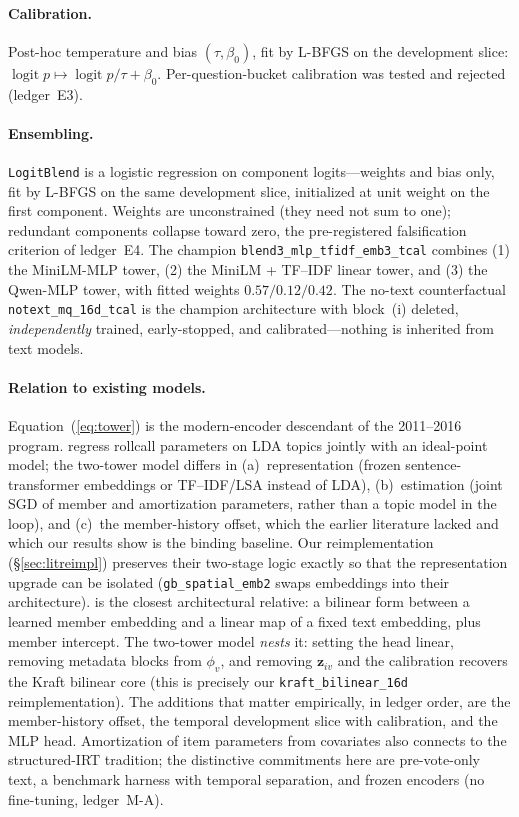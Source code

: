 \documentclass[11pt]{article}
\newcommand{\code}[1]{\texttt{#1}}
\begin{document}
\paragraph{Calibration.} Post-hoc temperature and bias
$(\tau, \beta_0)$, fit by L-BFGS on the development slice:
$\operatorname{logit} p \mapsto \operatorname{logit} p / \tau +
\beta_0$. Per-question-bucket calibration was tested and rejected
(ledger~E3).

\paragraph{Ensembling.} \code{LogitBlend} is a logistic regression on
component logits---weights and bias only, fit by L-BFGS on the same
development slice, initialized at unit weight on the first component.
Weights are unconstrained (they need not sum to one); redundant
components collapse toward zero, the pre-registered falsification
criterion of ledger~E4. The champion \code{blend3\_mlp\_tfidf\_emb3\_tcal}
combines (1) the MiniLM-MLP tower, (2) the MiniLM + TF--IDF linear
tower, and (3) the Qwen-MLP tower, with fitted weights
$0.57/0.12/0.42$. The no-text counterfactual \code{notext\_mq\_16d\_tcal}
is the champion architecture with block~(i) deleted,
\emph{independently} trained, early-stopped, and calibrated---nothing
is inherited from text models.

\paragraph{Relation to existing models.} Equation~(\ref{eq:tower}) is
the modern-encoder descendant of the 2011--2016 program.
\citet{gerrish2011predicting} regress rollcall parameters on LDA topics
jointly with an ideal-point model; the two-tower model differs in
(a)~representation (frozen sentence-transformer embeddings or
TF--IDF/LSA instead of LDA), (b)~estimation (joint SGD of member and
amortization parameters, rather than a topic model in the loop), and
(c)~the member-history offset, which the earlier literature lacked and
which our results show is the binding baseline. Our reimplementation
(\S\ref{sec:litreimpl}) preserves their two-stage logic exactly so that
the representation upgrade can be isolated (\code{gb\_spatial\_emb2}
swaps embeddings into their architecture). \citet{kraft2016embedding}
is the closest architectural relative: a bilinear form between a learned
member embedding and a linear map of a fixed text embedding, plus member
intercept. The two-tower model \emph{nests} it: setting the head linear,
removing metadata blocks from $\phi_v$, and removing $\mathbf{z}_{iv}$
and the calibration recovers the Kraft bilinear core (this is precisely
our \code{kraft\_bilinear\_16d} reimplementation). The additions that
matter empirically, in ledger order, are the member-history offset, the
temporal development slice with calibration, and the MLP head.
Amortization of item parameters from covariates also connects to the
structured-IRT tradition; the distinctive commitments here are
pre-vote-only text, a benchmark harness with temporal separation, and
frozen encoders (no fine-tuning, ledger~M-A).
\end{document}
